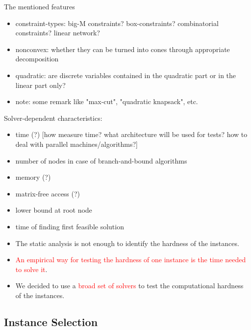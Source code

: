 The mentioned features 
\begin{itemize}
\item constraint-types: big-M constraints? box-constraints? combinatorial constraints? linear network?
\item nonconvex: whether they can be turned into cones through appropriate decomposition
\item quadratic: are discrete variables contained in the quadratic part or in the linear part only?
\item note: some remark like "max-cut", "quadratic knapsack", etc.
\end{itemize}





Solver-dependent characteristics:
\begin{itemize}
\item time (?) [how measure time? what architecture will be used for tests? how to deal with parallel machines/algorithms?]
\item number of nodes in case of branch-and-bound algorithms
\item memory (?)
\item matrix-free access (?)
\item lower bound at root node
\item time of finding first feasible solution
\end{itemize}


\begin{itemize}
\item The static analysis is not enough to identify the hardness of the instances.
\item \textcolor{red}{An empirical way for testing the hardness of one instance is the time needed to solve it}.
\item We decided to use a \textcolor{red}{broad set of solvers} to test the computational hardness of the instances.
\end{itemize}




\subsection{Instance Selection}\label{subsec:selection}








 

